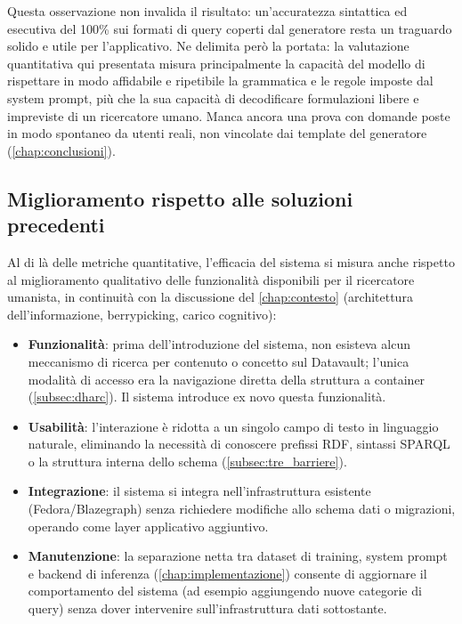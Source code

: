 \documentclass[12pt,a4paper,oneside]{book}
\begin{document}
Questa osservazione non invalida il risultato: un'accuratezza sintattica ed esecutiva del 100\% sui formati di query coperti dal generatore resta un traguardo solido e utile per l'applicativo. Ne delimita però la portata: la valutazione quantitativa qui presentata misura principalmente la capacità del modello di rispettare in modo affidabile e ripetibile la grammatica e le regole imposte dal system prompt, più che la sua capacità di decodificare formulazioni libere e impreviste di un ricercatore umano. Manca ancora una prova con domande poste in modo spontaneo da utenti reali, non vincolate dai template del generatore (\cref{chap:conclusioni}).

\subsection{Miglioramento rispetto alle soluzioni precedenti}\label{subsec:miglioramento}

Al di là delle metriche quantitative, l'efficacia del sistema si misura anche rispetto al miglioramento qualitativo delle funzionalità disponibili per il ricercatore umanista, in continuità con la discussione del \cref{chap:contesto} (architettura dell'informazione, berrypicking, carico cognitivo):

\begin{sloppypar}
\begin{itemize}
    \item \textbf{Funzionalità}: prima dell'introduzione del sistema, non esisteva alcun meccanismo di ricerca per contenuto o concetto sul Datavault; l'unica modalità di accesso era la navigazione diretta della struttura a container (\cref{subsec:dharc}). Il sistema introduce ex novo questa funzionalità.
    \item \textbf{Usabilità}: l'interazione è ridotta a un singolo campo di testo in linguaggio naturale, eliminando la necessità di conoscere prefissi RDF, sintassi SPARQL o la struttura interna dello schema (\cref{subsec:tre_barriere}).
    \item \textbf{Integrazione}: il sistema si integra nell'infrastruttura esistente (Fedora/Blazegraph) senza richiedere modifiche allo schema dati o migrazioni, operando come layer applicativo aggiuntivo.
    \item \textbf{Manutenzione}: la separazione netta tra dataset di training, system prompt e backend di inferenza (\cref{chap:implementazione}) consente di aggiornare il comportamento del sistema (ad esempio aggiungendo nuove categorie di query) senza dover intervenire sull'infrastruttura dati sottostante.
\end{itemize}
\end{sloppypar}
\end{document}

